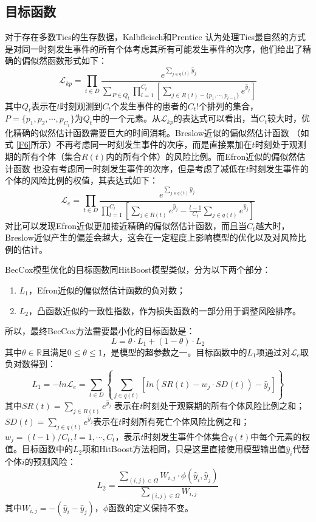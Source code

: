 \subsection{目标函数}

对于存在多数Ties的生存数据，Kalbfleisch和Prentice  认为处理Ties最自然的方式是对同一时刻发生事件的所有个体考虑其所有可能发生事件的次序，他们给出了精确的偏似然函数形式如下：$$
\mathcal{L}_{kp} = \prod_{t\in D} \frac{e^{\sum_{j\in q(t)} \hat{y}_j}}{\sum_{P\in Q_t} \prod_{l=1}^{C_t} [\sum_{j \in R(t)-\{p_1,\cdots ,p_{l-1}\}} e^{\hat{y}_j}]}
$$ 其中$Q_t$表示在$t$时刻观测到$C_t$个发生事件的患者的$C_t!$个排列的集合，$P=\{p_1,p_2,\cdots ,p_{C_t}\}$为$Q_t$中的一个元素。从$\mathcal{L}_{kp}$的表达式可以看出，当$C_t$较大时，优化精确的似然估计函数需要巨大的时间消耗。Breslow近似的偏似然估计函数 （如式 \eqref{F6}所示）不再考虑同一时刻发生事件的次序，而是直接累加在$t$时刻处于观测期的所有个体（集合$R(t)$内的所有个体）的风险比例。而Efron近似的偏似然估计函数 也没有考虑同一时刻发生事件的次序，但是考虑了减低在$t$时刻发生事件的个体的风险比例的权值，其表达式如下：$$
\mathcal{L}_{e} = \prod_{t\in D} \frac{e^{\sum_{j\in q(t)} \hat{y}_j}}{\prod_{l=1}^{C_t} \left[\sum_{j \in R(t)} e^{\hat{y}_j} - \frac{l-1}{C_t} \sum_{j \in q(t)} e^{\hat{y}_j} \right]}
$$ 对比可以发现Efron近似更加接近精确的偏似然估计函数，而且当$C_t$越大时，Breslow近似产生的偏差会越大，这会在一定程度上影响模型的优化以及对风险比例的估计。

BecCox模型优化的目标函数同HitBoost模型类似，分为以下两个部分：
\begin{enumerate}
	\item $L_1$，Efron近似的偏似然估计函数的负对数；
	\item $L_2$，凸函数近似的一致性指数，作为损失函数的一部分用于调整风险排序。
\end{enumerate}
所以，最终BecCox方法需要最小化的目标函数是：$$
L = \theta \cdot L_1 + (1- \theta) \cdot L_2
$$
其中$\theta \in \mathbb{R}$且满足$0 \le \theta \le 1$，是模型的超参数之一。目标函数中的$L_1$项通过对$\mathcal{L}_e$取负对数得到：$$
L_1 = -ln\mathcal{L}_e = \sum_{t\in D} \left\{ \sum_{j\in q(t)} [ln(SR(t)-w_j\cdot SD(t))-\hat{y}_j] \right\}
$$ 其中$SR(t)=\sum_{j\in R(t)} e^{\hat{y}_j}$ 表示在$t$时刻处于观察期的所有个体风险比例之和；$SD(t)=\sum_{j\in q(t)} e^{\hat{y}_j}$表示在$t$时刻所有死亡个体风险比例之和；$w_j=(l-1)/C_t, l=1,\cdots,C_t$，表示$t$时刻发生事件个体集合$q(t)$中每个元素的权值。目标函数中的$L_2$项和HitBoost方法相同，只是这里直接使用模型输出值$\hat{y}_i$代替个体$i$的预测风险：$$
L_2 = \frac{\sum_{(i,j)\in \Omega} W_{i,j}\cdot \phi(\hat{y}_i, \hat{y}_j)}{\sum_{(i,j)\in \Omega} W_{i,j}}
$$ 其中$W_{i,j}=-(\hat{y}_i-\hat{y}_j)$，$\phi$函数的定义保持不变。

